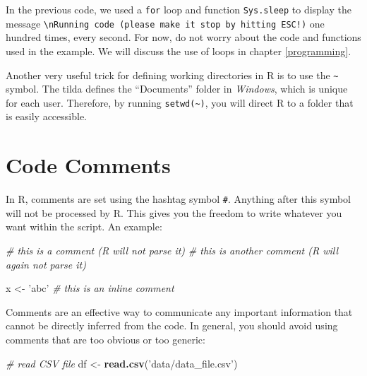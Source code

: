 \documentclass[
  12pt,
]{book}
\newenvironment{Shaded}{\begin{snugshade}}{\end{snugshade}}
\newcommand{\CommentTok}[1]{\textcolor[rgb]{0.37,0.37,0.37}{\textit{#1}}}
\newcommand{\KeywordTok}[1]{\textcolor[rgb]{0.27,0.27,0.27}{\textbf{#1}}}
\newcommand{\NormalTok}[1]{#1}
\newcommand{\StringTok}[1]{\textcolor[rgb]{0.5,0.5,0.5}{#1}}
\newenvironment{rmdimportant}
{\begin{importantblock}
		
	} {\end{importantblock}}
\begin{document}
In the previous code, we used a \texttt{for} loop and function \texttt{Sys.sleep} to display the message \texttt{\textquotesingle{}\textbackslash{}nRunning\ code\ (please\ make\ it\ stop\ by\ hitting\ ESC!)\textquotesingle{}} one hundred times, every second. For now, do not worry about the code and functions used in the example. We will discuss the use of loops in chapter \ref{programming}.

\begin{rmdimportant}
Another very useful trick for defining working directories in R is to
use the \texttt{\textasciitilde{}} symbol. The tilda defines the
``Documents'' folder in \emph{Windows}, which is unique for each user.
Therefore, by running
\texttt{setwd(\textquotesingle{}\textasciitilde{}\textquotesingle{})},
you will direct R to a folder that is easily accessible.
\end{rmdimportant}

\hypertarget{code-comments}{%
\section{Code Comments}\label{code-comments}}

In R, comments are set using the hashtag symbol \texttt{\#}. Anything after this symbol will not be processed by R. This gives you the freedom to write whatever you want within the script. An example:

\begin{Shaded}
\begin{Highlighting}[]
\CommentTok{# this is a comment (R will not parse it)}
\CommentTok{# this is another comment (R will again not parse it)}

\NormalTok{x <-}\StringTok{ 'abc'} \CommentTok{# this is an inline comment}
\end{Highlighting}
\end{Shaded}

Comments are an effective way to communicate any important information that cannot be directly inferred from the code. In general, you should avoid using comments that are too obvious or too generic:

\begin{Shaded}
\begin{Highlighting}[]
\CommentTok{# read CSV file}
\NormalTok{df <-}\StringTok{ }\KeywordTok{read.csv}\NormalTok{(}\StringTok{'data/data_file.csv'}\NormalTok{)}
\end{Highlighting}
\end{Shaded}
\end{document}
